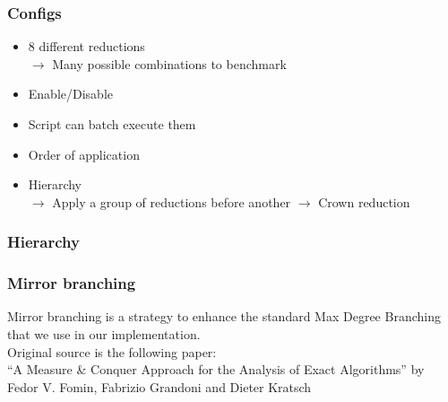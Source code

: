 \documentclass{beamer}[12pt]
\begin{document}
\begin{frame}
\frametitle{Configs}
\begin{itemize}[label={$\bullet$}]
\item 8 different reductions\\
$\rightarrow$ Many possible combinations to benchmark
\item Enable/Disable
\item Script can batch execute them
\item Order of application
\item Hierarchy \\
$\rightarrow$ Apply a group of reductions before another
$\rightarrow$ Crown reduction
\end{itemize}
\end{frame}

\begin{frame}
\frametitle{Hierarchy}

\end{frame}


	\begin{frame}
		\frametitle{Mirror branching}
		
		\vspace*{1cm}
		Mirror branching is a strategy to enhance the standard Max Degree Branching that we use in our implementation. \\
		\vspace*{2cm}
		{\small	Original source is the following paper:\\}
		{\small ``A Measure \& Conquer Approach for the
		Analysis of Exact Algorithms'' by Fedor V. Fomin, Fabrizio Grandoni and Dieter Kratsch}
	\end{frame}
	
\end{document}
